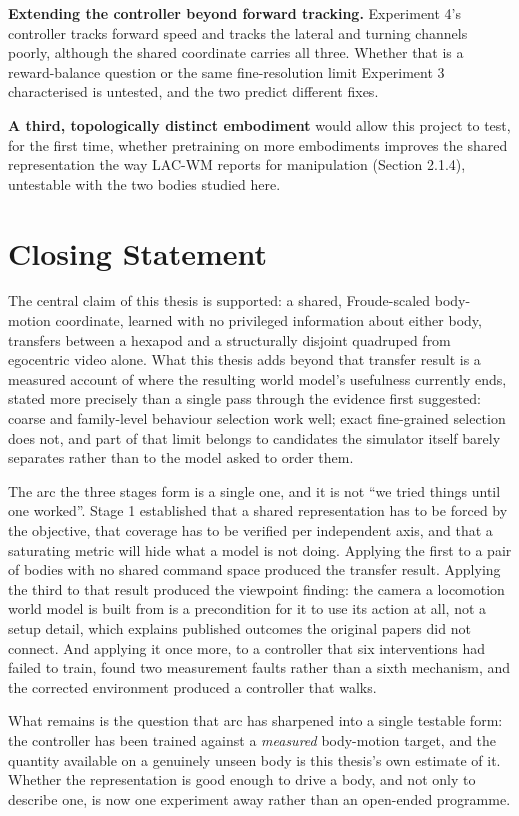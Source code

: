 \documentclass[12pt,a4paper,oneside]{report}
\begin{document}
\textbf{Extending the controller beyond forward tracking.} Experiment 4's controller tracks forward speed and
tracks the lateral and turning channels poorly, although the shared coordinate carries all three. Whether that is a
reward-balance question or the same fine-resolution limit Experiment 3 characterised is untested, and the two
predict different fixes.

\textbf{A third, topologically distinct embodiment} would allow this project to test, for the first time, whether
pretraining on more embodiments improves the shared representation the way LAC-WM reports for manipulation
(Section 2.1.4), untestable with the two bodies studied here.

\section{Closing Statement}
The central claim of this thesis is supported: a shared, Froude-scaled body-motion coordinate, learned with no
privileged information about either body, transfers between a hexapod and a structurally disjoint quadruped from
egocentric video alone. What this thesis adds beyond that transfer result is a measured account of where the
resulting world model's usefulness currently ends, stated more precisely than a single pass through the evidence
first suggested: coarse and family-level behaviour selection work well; exact fine-grained selection does not, and
part of that limit belongs to candidates the simulator itself barely separates rather than to the model asked to
order them.

The arc the three stages form is a single one, and it is not ``we tried things until one worked''. Stage 1
established that a shared representation has to be forced by the objective, that coverage has to be verified per
independent axis, and that a saturating metric will hide what a model is not doing. Applying the first to a pair of
bodies with no shared command space produced the transfer result. Applying the third to that result produced the
viewpoint finding: the camera a locomotion world model is built from is a precondition for it to use its action at
all, not a setup detail, which explains published outcomes the original papers did not connect. And applying it
once more, to a controller that six interventions had failed to train, found two measurement faults rather than a
sixth mechanism, and the corrected environment produced a controller that walks.

What remains is the question that arc has sharpened into a single testable form: the controller has been trained
against a \emph{measured} body-motion target, and the quantity available on a genuinely unseen body is this
thesis's own estimate of it. Whether the representation is good enough to drive a body, and not only to describe
one, is now one experiment away rather than an open-ended programme.
\end{document}
